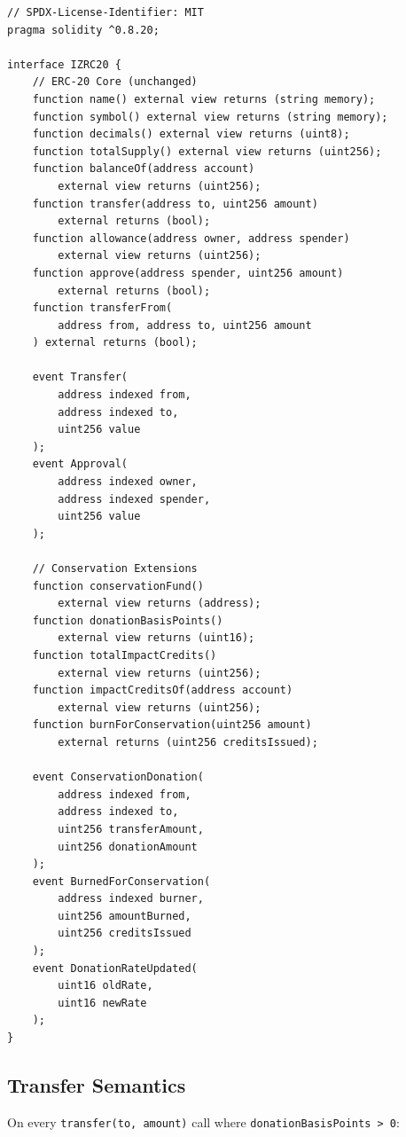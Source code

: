 \documentclass[11pt,letterpaper]{article}
\begin{document}
\begin{lstlisting}[language=Solidity,caption=IZRC20 core interface]
// SPDX-License-Identifier: MIT
pragma solidity ^0.8.20;

interface IZRC20 {
    // ERC-20 Core (unchanged)
    function name() external view returns (string memory);
    function symbol() external view returns (string memory);
    function decimals() external view returns (uint8);
    function totalSupply() external view returns (uint256);
    function balanceOf(address account)
        external view returns (uint256);
    function transfer(address to, uint256 amount)
        external returns (bool);
    function allowance(address owner, address spender)
        external view returns (uint256);
    function approve(address spender, uint256 amount)
        external returns (bool);
    function transferFrom(
        address from, address to, uint256 amount
    ) external returns (bool);

    event Transfer(
        address indexed from,
        address indexed to,
        uint256 value
    );
    event Approval(
        address indexed owner,
        address indexed spender,
        uint256 value
    );

    // Conservation Extensions
    function conservationFund()
        external view returns (address);
    function donationBasisPoints()
        external view returns (uint16);
    function totalImpactCredits()
        external view returns (uint256);
    function impactCreditsOf(address account)
        external view returns (uint256);
    function burnForConservation(uint256 amount)
        external returns (uint256 creditsIssued);

    event ConservationDonation(
        address indexed from,
        address indexed to,
        uint256 transferAmount,
        uint256 donationAmount
    );
    event BurnedForConservation(
        address indexed burner,
        uint256 amountBurned,
        uint256 creditsIssued
    );
    event DonationRateUpdated(
        uint16 oldRate,
        uint16 newRate
    );
}
\end{lstlisting}

\subsection{Transfer Semantics}

On every \texttt{transfer(to, amount)} call where \texttt{donationBasisPoints > 0}:
\end{document}
